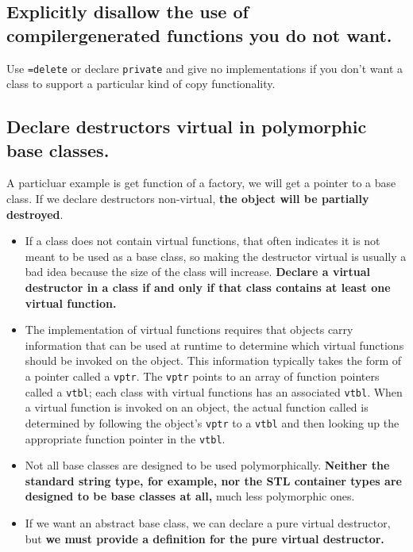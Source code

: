 \subsection{Explicitly disallow the use of compilergenerated functions
  you do not want.}
\label{sec:Item-6}

Use \texttt{=delete} or declare \texttt{private} and give no
implementations if you don't want a class to support a particular
kind of copy functionality.

\subsection{Declare destructors virtual in polymorphic base classes.}
\label{sec:Item-7}

A particluar example is get function of a factory, we will get a
pointer to a base class. If we declare destructors non-virtual, \textbf{the
  object will be partially destroyed}.

\begin{itemize}
\item If a class does not contain virtual functions, that often indicates it is
not meant to be used as a base class, so making the
destructor virtual is usually a bad idea because the size of the
class will increase. \textbf{Declare a virtual destructor in a
class if and only if that class contains at least one virtual function.}
\item The implementation of virtual functions requires that objects carry
information that can be used at runtime to determine which virtual
functions should be invoked on the object. This information typically
takes the form of a pointer called a \texttt{vptr}. The
\texttt{vptr} points to an array of function pointers called a
\texttt{vtbl}; each class with virtual functions has an associated
\texttt{vtbl}. When a virtual function is invoked on an object, the
actual function called is determined by following the object's
\texttt{vptr} to a \texttt{vtbl} and then looking up the appropriate
function pointer in the \texttt{vtbl}. 
\item Not all base classes are designed to be used polymorphically. \textbf{Neither
the standard string type, for example, nor the STL container types are
designed to be base classes at all,} much less polymorphic ones.
\item If we want an abstract base class, we can declare a pure virtual
  destructor, but \textbf{we must provide a definition for the pure
    virtual destructor.}
\end{itemize}

